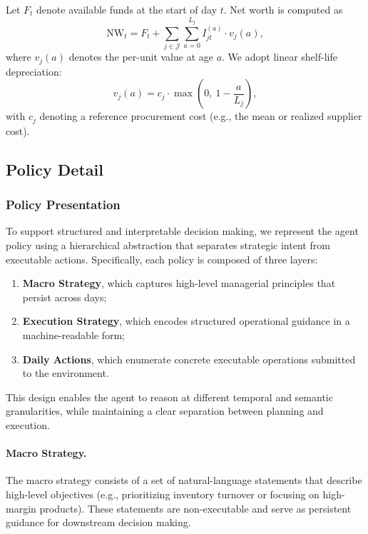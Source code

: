 Let $F_t$ denote available funds at the start of day $t$. Net worth is computed as
\begin{equation}
\mathrm{NW}_t = F_t + \sum_{j\in\mathcal{J}} \sum_{a=0}^{L_j} I_{jt}^{(a)} \cdot v_j(a),
\end{equation}
where $v_j(a)$ denotes the per-unit value at age $a$. We adopt linear shelf-life depreciation:
\begin{equation}
v_j(a) = c_j \cdot \max\!\left(0,\ 1 - \frac{a}{L_j}\right),
\end{equation}
with $c_j$ denoting a reference procurement cost (e.g., the mean or realized supplier cost).


\subsection{Policy Detail}
\subsubsection{Policy Presentation}
\label{appendix:policy}

To support structured and interpretable decision making, we represent the agent policy using a hierarchical abstraction that separates strategic intent from executable actions.
Specifically, each policy is composed of three layers:

\begin{enumerate}
    \item \textbf{Macro Strategy}, which captures high-level managerial principles that persist across days;
    \item \textbf{Execution Strategy}, which encodes structured operational guidance in a machine-readable form;
    \item \textbf{Daily Actions}, which enumerate concrete executable operations submitted to the environment.
\end{enumerate}

This design enables the agent to reason at different temporal and semantic granularities, while maintaining a clear separation between planning and execution.

\paragraph{Macro Strategy.}
The macro strategy consists of a set of natural-language statements that describe high-level objectives (e.g., prioritizing inventory turnover or focusing on high-margin products).
These statements are non-executable and serve as persistent guidance for downstream decision making.

